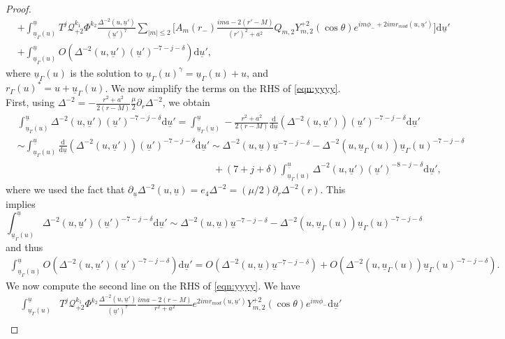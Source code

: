 \documentclass[10pt,a4paper]{amsart}
\newcommand{\carterp}{\mcq_{+2}}
\newcommand{\dee}{\mathrm{d}}
\newcommand{\mcq}{\mathcal{Q}}
\newcommand{\sfrak}{2}
\newcommand{\ubar}{{\underline{u}}}
\begin{document}
\begin{proof}
\begin{align}
    &+\int_{\ubar_\Gamma(u)}^\ubar T^j\carterp^{k_1}\Phi^{k_2}\frac{\Delta^{-2}(u,\ubar')}{(\ubar')^7}\sum_{|m|\leq2}\Big[A_m(r_-)\frac{ima-2(r'-M)}{(r')^2+a^2}Q_{m,\sfrak}Y_{m,\sfrak}^{+\sfrak}(\cos\theta)e^{im\phi_{-}+2imr_{mod}(u,\ubar')}\Big]\dee\ubar'\nonumber\\
    &+ \int_{\ubar_\Gamma(u)}^\ubar O(\Delta^{-2}(u,\ubar')(\ubar')^{-7-j-\delta})\dee\ubar',\label{eqn:yyyy}
\end{align}
{where $\ubar_{\Gamma}(u)$ is the solution to $\ubar_{\Gamma}(u)^\gamma=\ubar_{\Gamma}(u)+u$, and $r_\Gamma(u)^*=u+\ubar_{\Gamma}(u)$}. We now simplify the terms on the RHS of \eqref{eqn:yyyy}. First, {using $\Delta^{-2}=-\frac{r^2+a^2}{2(r-M)}\frac{\mu}{2}\partial_r\Delta^{-2}$, we obtain }
\begin{align*}
    &\int_{\ubar_\Gamma(u)}^\ubar\Delta^{-2}(u,\ubar')(\ubar')^{-7-j-\delta}\dee\ubar'=\int_{\ubar_\Gamma(u)}^\ubar-\frac{r^2+a^2}{2(r-M)}\frac{\dee}{\dee\ubar}(\Delta^{-2}(u,\ubar'))(\ubar')^{-7-j-\delta}\dee\ubar'\\
    &\sim\int_{\ubar_\Gamma(u)}^\ubar\frac{\dee}{\dee\ubar}(\Delta^{-2}(u,\ubar'))(\ubar')^{-7-j-\delta}\dee\ubar'\sim \Delta^{-2}(u,\ubar)\ubar^{-7-j-\delta}-\Delta^{-2}(u,\ubar_\Gamma(u))\ubar_\Gamma(u)^{-7-j-\delta}\\
    &\quad\quad\quad\quad\quad\quad\quad\quad\quad\quad\quad\quad\quad\quad\quad\quad\quad\quad\quad\quad+(7+j+\delta)\int_{\ubar_\Gamma(u)}^\ubar\Delta^{-2}(u,\ubar')(\ubar')^{-8-j-\delta}\dee\ubar',
\end{align*}
where we used the fact that $\partial_\ubar\Delta^{-2}(u,\ubar)=e_4\Delta^{-2}=(\mu/2)\partial_r\Delta^{-2}(r)$. This implies 
$$\int_{\ubar_\Gamma(u)}^\ubar\Delta^{-2}(u,\ubar')(\ubar')^{-7-j-\delta}\dee\ubar'\sim\Delta^{-2}(u,\ubar)\ubar^{-7-j-\delta}-\Delta^{-2}(u,\ubar_\Gamma(u))\ubar_\Gamma(u)^{-7-j-\delta}$$
and thus
\begin{align}\label{eqn:delta1}
    \int_{\ubar_\Gamma(u)}^\ubar O(\Delta^{-2}(u,\ubar')(\ubar')^{-7-j-\delta})\dee\ubar'=O(\Delta^{-2}(u,\ubar)\ubar^{-7-j-\delta})+O(\Delta^{-2}(u,\ubar_\Gamma(u))\ubar_\Gamma(u)^{-7-j-\delta}).
\end{align}
We now compute the second line on the RHS of \eqref{eqn:yyyy}. We have 
\begin{align}
    \int_{\ubar_\Gamma(u)}^\ubar &T^j\carterp^{k_1}\Phi^{k_2}\frac{\Delta^{-2}(u,\ubar')}{(\ubar')^7}\frac{ima-2(r-M)}{r^2+a^2}e^{2imr_{mod}(u,\ubar')}Y_{m,\sfrak}^{+\sfrak}(\cos\theta)e^{im\phi_{-}}\dee\ubar'\nonumber\\

\end{align}
\end{proof}
\end{document}
